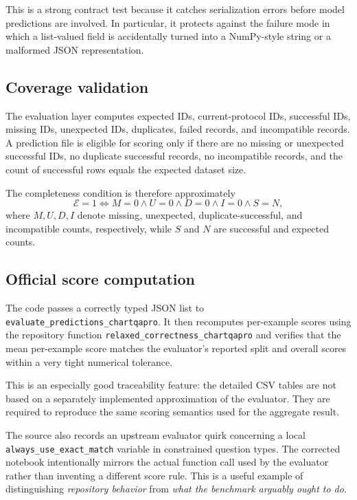 \documentclass[11pt,a4paper]{article}
\newcommand{\code}[1]{\texttt{#1}}
\newcommand{\term}[1]{\textit{#1}}
\begin{document}
This is a strong contract test because it catches serialization errors before model predictions are involved. In particular, it protects against the failure mode in which a list-valued field is accidentally turned into a NumPy-style string or a malformed JSON representation.

\subsection{Coverage validation}
The evaluation layer computes expected IDs, current-protocol IDs, successful IDs, missing IDs, unexpected IDs, duplicates, failed records, and incompatible records. A prediction file is eligible for scoring only if there are no missing or unexpected successful IDs, no duplicate successful records, no incompatible records, and the count of successful rows equals the expected dataset size.

The completeness condition is therefore approximately
\begin{equation}
\mathcal{E}=1
\iff
M=0 \land U=0 \land D=0 \land I=0 \land S=N,
\end{equation}
where \(M,U,D,I\) denote missing, unexpected, duplicate-successful, and incompatible counts, respectively, while \(S\) and \(N\) are successful and expected counts.

\subsection{Official score computation}
The code passes a correctly typed JSON list to \code{evaluate\_predictions\_chartqapro}. It then recomputes per-example scores using the repository function \code{relaxed\_correctness\_chartqapro} and verifies that the mean per-example score matches the evaluator's reported split and overall scores within a very tight numerical tolerance.

This is an especially good traceability feature: the detailed CSV tables are not based on a separately implemented approximation of the evaluator. They are required to reproduce the same scoring semantics used for the aggregate result.

The source also records an upstream evaluator quirk concerning a local \code{always\_use\_exact\_match} variable in constrained question types. The corrected notebook intentionally mirrors the actual function call used by the evaluator rather than inventing a different score rule. This is a useful example of distinguishing \term{repository behavior} from \term{what the benchmark arguably ought to do}.
\end{document}
